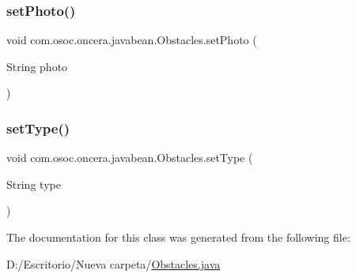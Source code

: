 \mbox{\label{classcom_1_1osoc_1_1oncera_1_1javabean_1_1_obstacles_a57e6588eba62f178e4b0dbf15ec8ae2e}} 
\subsubsection{\texorpdfstring{setPhoto()}{setPhoto()}}
{\footnotesize\ttfamily void com.\+osoc.\+oncera.\+javabean.\+Obstacles.\+set\+Photo (\begin{DoxyParamCaption}\item[{String}]{photo }\end{DoxyParamCaption})}

\mbox{\label{classcom_1_1osoc_1_1oncera_1_1javabean_1_1_obstacles_a4d3765d93fb192bdc1ed6e3403f8d189}} 
\subsubsection{\texorpdfstring{setType()}{setType()}}
{\footnotesize\ttfamily void com.\+osoc.\+oncera.\+javabean.\+Obstacles.\+set\+Type (\begin{DoxyParamCaption}\item[{String}]{type }\end{DoxyParamCaption})}



The documentation for this class was generated from the following file\+:\begin{DoxyCompactItemize}
\item 
D\+:/\+Escritorio/\+Nueva carpeta/\mbox{\hyperlink{_obstacles_8java}{Obstacles.\+java}}\end{DoxyCompactItemize}
